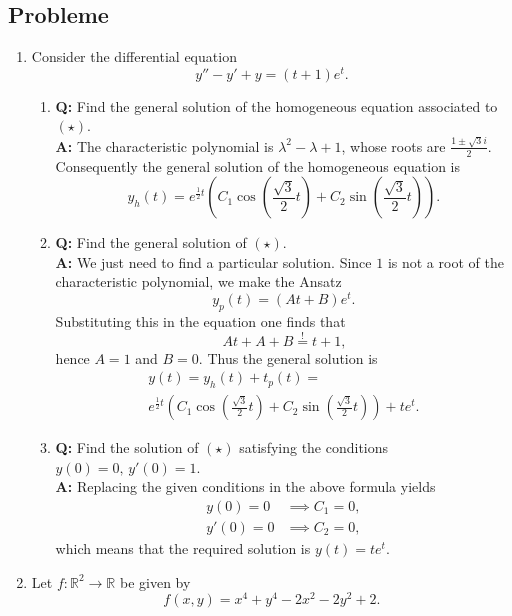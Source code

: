 \documentclass[a4paper,10pt]{article}
\def\R{\mathbb{R}}
\begin{document}
\subsection{Probleme}
\begin{enumerate}
    \item Consider the differential equation
    \[y'' - y' + y = (t + 1) e^t \text{.} \tag{\star}\]
    \begin{enumerate}
        \item \textbf{Q:} Find the general solution of the homogeneous equation associated to $(\star)$.\\
        \textbf{A:} The characteristic polynomial is $\lambda^2 - \lambda + 1$, whose roots are $\frac{1 \pm \sqrt{3}i}{2}$. Consequently the general solution of the homogeneous equation is
        \[y_h(t) = e^{\frac{1}{2}t} \left(C_1 \cos \left(\frac{\sqrt{3}}{2} t\right) + C_2 \sin \left(\frac{\sqrt{3}}{2} t\right)\right) \text{.}\]
        \item \textbf{Q:} Find the general solution of $(\star)$.\\
        \textbf{A:} We just need to find a particular solution. Since $1$ is not a root of the characteristic polynomial, we make the Ansatz
        \[y_p(t) = (At + B) e^t \text{.}\]
        Substituting this in the equation one finds that
        \[At + A + B \overset{!}{=} t + 1 \text{,}\]
        hence $A = 1$ and $B = 0$. Thus the general solution is
        \begin{multline*}
            y(t) = y_h(t) + t_p(t) =\\
            e^{\frac{1}{2} t} \left(C_1 \cos \left(\frac{\sqrt{3}}{2} t \right) + C_2 \sin \left(\frac{\sqrt{3}}{2} t\right)\right) + te^t \text{.}
        \end{multline*}
        \item \textbf{Q:} Find the solution of $(\star)$ satisfying the conditions $y(0) = 0,\, y'(0) = 1$.\\
        \textbf{A:} Replacing the given conditions in the above formula yields
        \begin{align*}
            y(0) = 0 &\implies C_1 = 0,\\
            y'(0) = 0 &\implies C_2 = 0 \text{,}
        \end{align*}
        which means that the required solution is $y(t) = te^t$.
    \end{enumerate}
    \item Let $f: \R^2 \to \R$ be given by
    \[f(x, y) = x^4 + y^4 - 2x^2 -2y^2 + 2 \text{.}\]

\end{enumerate}
\end{document}
